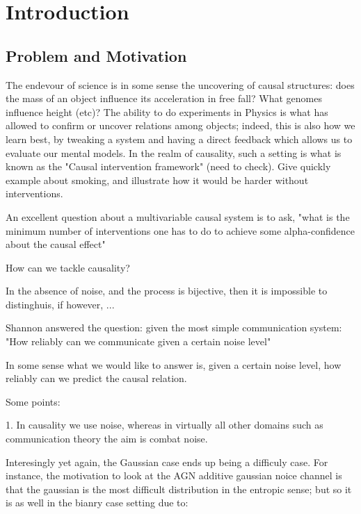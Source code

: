 
\chapter{Introduction}

\section{Problem and Motivation}

The endevour of science is in some sense the uncovering of causal structures: does the mass
of an object influence its acceleration in free fall? What genomes influence height (etc)? 
The ability to do experiments in Physics is what has allowed to confirm or uncover relations
among objects; indeed, this is also how we learn best, by tweaking a system and having a 
direct feedback which allows us to evaluate our mental models. In the realm of causality, 
such a setting is what is known as the "Causal intervention framework" (need to check). 
Give quickly example about smoking, and illustrate how it would be harder without interventions.



An excellent question about a multivariable causal system is to ask, "what is the minimum number
of interventions one has to do to achieve some alpha-confidence about the causal effect"


How can we tackle causality?

In the absence of noise, and the process is bijective, then it is impossible to distinghuis, 
if however, ...

Shannon answered the question: given the most simple communication system: "How reliably can 
we communicate given a certain noise level"

In some sense what we would like to answer is, given a certain noise level, how reliably can we 
predict the causal relation. 

Some points:

1. In causality we use noise, whereas in virtually all other domains
 such as communication theory the aim is combat noise.

 Interesingly yet again, the Gaussian case ends up being a difficuly case. For instance, 
 the motivation to look at the AGN additive gaussian noice channel is that the gaussian is 
 the most difficult distribution in the entropic sense; but so it is as well in the 
 bianry case setting due to:

